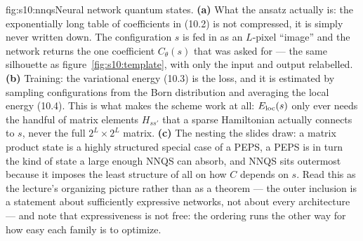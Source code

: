 \begin{aqmfigure}{fig:s10:nnqs}{Neural network quantum states. \textbf{(a)} What the ansatz
actually is: the exponentially long table of coefficients in (10.2) is not compressed, it is
simply never written down. The configuration $s$ is fed in as an $L$-pixel ``image'' and the
network returns the one coefficient $C_\theta(s)$ that was asked for --- the same silhouette as
figure~\ref{fig:s10:template}, with only the input and output relabelled. \textbf{(b)} Training:
the variational energy (10.3) is the loss, and it is estimated by sampling configurations from the
Born distribution and averaging the local energy (10.4). This is what makes the scheme work at
all: $E_{\rm loc}(s)$ only ever needs the handful of matrix elements $H_{ss'}$ that a sparse
Hamiltonian actually connects to $s$, never the full $2^L\times2^L$ matrix. \textbf{(c)} The
nesting the slides draw: a matrix product state is a highly structured special case of a PEPS, a
PEPS is in turn the kind of state a large enough NNQS can absorb, and NNQS sits outermost because
it imposes the least structure of all on how $C$ depends on $s$. Read this as the lecture's
organizing picture rather than as a theorem --- the outer inclusion is a statement about
sufficiently expressive networks, not about every architecture --- and note that expressiveness is
not free: the ordering runs the other way for how easy each family is to optimize.}

\end{aqmfigure}
